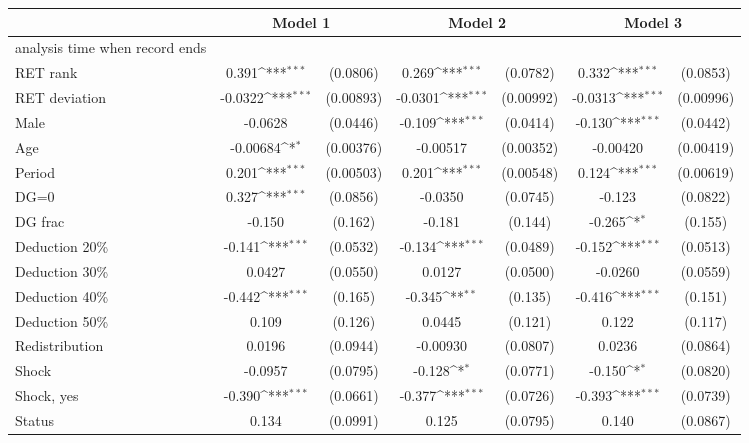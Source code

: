 {
\def\sym#1{\ifmmode^{#1}\else\(^{#1}\)\fi}
\begin{tabular}{l*{3}{cc}}
\hline\hline
                &\multicolumn{2}{c}{Model 1} &\multicolumn{2}{c}{Model 2} &\multicolumn{2}{c}{Model 3} \\
\hline
analysis time when record ends&                  &         &                  &         &                  &         \\
RET rank        &    0.391\sym{***}& (0.0806)&    0.269\sym{***}& (0.0782)&    0.332\sym{***}& (0.0853)\\
RET deviation   &  -0.0322\sym{***}&(0.00893)&  -0.0301\sym{***}&(0.00992)&  -0.0313\sym{***}&(0.00996)\\
Male            &  -0.0628         & (0.0446)&   -0.109\sym{***}& (0.0414)&   -0.130\sym{***}& (0.0442)\\
Age             & -0.00684\sym{*}  &(0.00376)& -0.00517         &(0.00352)& -0.00420         &(0.00419)\\
Period          &    0.201\sym{***}&(0.00503)&    0.201\sym{***}&(0.00548)&    0.124\sym{***}&(0.00619)\\
DG=0            &    0.327\sym{***}& (0.0856)&  -0.0350         & (0.0745)&   -0.123         & (0.0822)\\
DG frac         &   -0.150         &  (0.162)&   -0.181         &  (0.144)&   -0.265\sym{*}  &  (0.155)\\
Deduction 20\%  &   -0.141\sym{***}& (0.0532)&   -0.134\sym{***}& (0.0489)&   -0.152\sym{***}& (0.0513)\\
Deduction 30\%  &   0.0427         & (0.0550)&   0.0127         & (0.0500)&  -0.0260         & (0.0559)\\
Deduction 40\%  &   -0.442\sym{***}&  (0.165)&   -0.345\sym{**} &  (0.135)&   -0.416\sym{***}&  (0.151)\\
Deduction 50\%  &    0.109         &  (0.126)&   0.0445         &  (0.121)&    0.122         &  (0.117)\\
Redistribution  &   0.0196         & (0.0944)& -0.00930         & (0.0807)&   0.0236         & (0.0864)\\
Shock           &  -0.0957         & (0.0795)&   -0.128\sym{*}  & (0.0771)&   -0.150\sym{*}  & (0.0820)\\
Shock, yes      &   -0.390\sym{***}& (0.0661)&   -0.377\sym{***}& (0.0726)&   -0.393\sym{***}& (0.0739)\\
Status          &    0.134         & (0.0991)&    0.125         & (0.0795)&    0.140         & (0.0867)\\

\end{tabular}}
